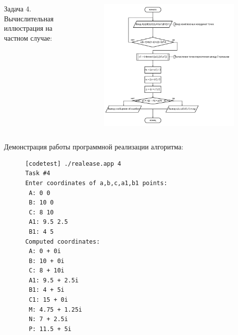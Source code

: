 \documentclass{beamer}
\begin{document}
\begin{frame}
   \begin{columns}
      \begin{column}{0.3\textwidth}
         \begin{block}{Задача 4. Вычислительная иллюстрация на частном случае:}
         \end{block}
      \end{column}
      \begin{column}{0.7\textwidth}
         \begin{figure}[h]
            \includegraphics[width=1\textwidth]{images/task4-diagram.png}
         \end{figure}
      \end{column}
   \end{columns}
\end{frame}

\begin{frame}[fragile]
   Демонстрация работы программной реализации алгоритма:
   \begin{verbatim}
      [codetest] ./realease.app 4
      Task #4
      Enter coordinates of a,b,c,a1,b1 points:
       A: 0 0
       B: 10 0
       C: 8 10
       A1: 9.5 2.5
       B1: 4 5
      Computed coordinates:
       A: 0 + 0i
       B: 10 + 0i
       C: 8 + 10i
       A1: 9.5 + 2.5i
       B1: 4 + 5i
       C1: 15 + 0i
       M: 4.75 + 1.25i
       N: 7 + 2.5i
       P: 11.5 + 5i
   \end{verbatim}
\end{frame}
\end{document}
